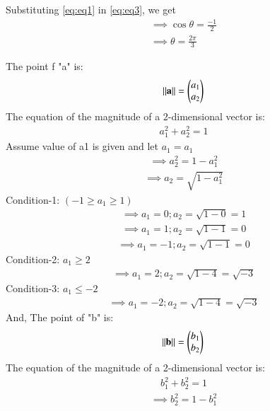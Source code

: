\documentclass[12pt,-letter paper]{article}
\let\vec\mathbf{}
\let\vec\mathbf{}
\let\vec\mathbf{}
\newcommand{\myvec}[1]{\ensuremath{\begin{pmatrix}#1\end{pmatrix}}}
\begin{document}
\begin{enumerate}
Substituting \eqref{eq:eq1} in \eqref{eq:eq3}, we get
\begin{align}
	\implies \cos{\theta}=\frac{-1}{2}
	\\
	\implies \theta=\frac{2\pi}{3}
\end{align}

The point f "a" is:
\begin{align}
    \norm{\vec{a}}=\myvec{a_1 \\ a_2} 
    \end{align}
    The equation of the magnitude of a 2-dimensional vector is: 
    \begin{align}
    a_1^2 +a_2^2 =1
    \end{align}
    Assume value of a1 is given and let $a_1=a_1$ 
  \begin{align}
   \implies   a_2^2 = 1-a_1^2 
    \end{align}
    \begin{align}
 \implies     a_2 = \sqrt{1-a_1^2}
 \label{eq:eq10}
     \end{align}
     Condition-1:  $(-1 \geq a_1 \geq 1)$
     \begin{align}
     \implies a_1=0;   a_2=\sqrt{1-0}=1
     \end{align}
      \begin{align}
     \implies a_1=1;   a_2=\sqrt{1-1}=0
     \end{align}
     \begin{align}
     \implies a_1=-1;   a_2=\sqrt{1-1}=0
     \end{align}
        Condition-2: $a_1 \geq 2$
         \begin{align}
     \implies a_1=2;   a_2=\sqrt{1-4}=\sqrt{-3}
     \end{align}
     Condition-3: $a_1 \leq -2$
         \begin{align}
     \implies a_1=-2;   a_2=\sqrt{1-4}=\sqrt{-3}
     \end{align}
And, 
The point of "b" is:
\begin{align}
    \norm{\vec{b}}=\myvec{b_1 \\ b_2} 
    \end{align}
    The equation of the magnitude of a 2-dimensional vector is: 
    \begin{align}
    b_1^2 +b_2^2 =1
    \end{align}
  \begin{align}
   \implies   b_2^2 = 1-b_1^2 
    \end{align}
    \begin{align}

\end{align}
\end{enumerate}
\end{document}
